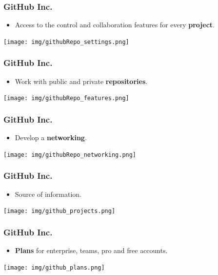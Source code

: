 \documentclass[svgnames]{beamer}
\begin{document}
\begin{frame}
\frametitle{GitHub Inc.}
  \begin{itemize}
  \item Access to the control and collaboration features for every \textbf{project}.
  \end{itemize}

\begin{center}
\texttt{[image: img/githubRepo\_settings.png]}
\end{center}   

\end{frame}


\begin{frame}
\frametitle{GitHub Inc.}
  \begin{itemize}
  \item Work with public and private \textbf{repositories}. 
  \end{itemize}

\begin{center}
\texttt{[image: img/githubRepo\_features.png]}
\end{center}  

\end{frame}


\begin{frame}
\frametitle{GitHub Inc.}
\begin{itemize}
  \item Develop a \textbf{networking}.
\end{itemize}

\begin{center}
\texttt{[image: img/githubRepo\_networking.png]}
\end{center}  

\end{frame}

\begin{frame}
\frametitle{GitHub Inc.}
\begin{itemize}
  \item Source of information.
\end{itemize}
\begin{center}
\texttt{[image: img/github\_projects.png]}
\end{center}  

\end{frame}

\begin{frame}
    \frametitle{GitHub Inc.}
    \begin{itemize}
        \item \textbf{Plans} for enterprise, teams, pro and free accounts. \hfill \break
    \end{itemize}

\begin{center}
\texttt{[image: img/github\_plans.png]}
\end{center}  


\end{frame}
\end{document}

